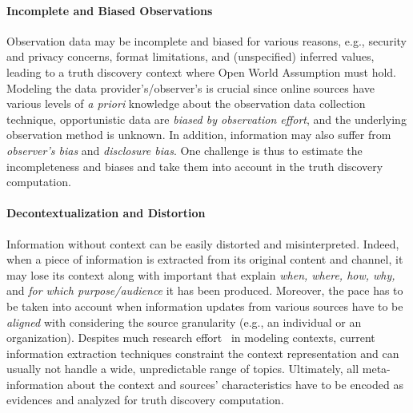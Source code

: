\documentclass[prodmode,acmtecs]{acmsmall} %
\begin{document}
\paragraph*{Incomplete and Biased Observations}  
Observation data may be incomplete and biased for various 
reasons, e.g., security and privacy concerns, format limitations, and 
(unspecified) inferred values, leading to a truth discovery context where Open World
Assumption must hold. Modeling the data provider's/observer's is crucial since online 
sources have  various levels of {\it a priori} knowledge about the observation data 
collection technique, opportunistic data are {\it biased by  observation effort}, and the underlying
observation method is unknown. In addition, information may also suffer from \emph{observer's bias} and
\emph{disclosure bias}. One challenge is thus to estimate the incompleteness and biases and take them into
account in the truth discovery computation.

\paragraph*{Decontextualization and Distortion}  
Information without context can be easily distorted and misinterpreted.
Indeed, when a piece of information is extracted from its original 
content and channel, it may lose its context along with important 
 that explain \emph{when, where, how, why,} and
\emph{for which purpose/audience} it has been produced.
Moreover, the pace has to be taken into account when information updates from 
various sources have to be \emph{aligned} with considering the source granularity 
(e.g., an individual or an organization). 
Despites much research effort~\cite{eps270829} in modeling contexts, current information
extraction techniques constraint the 
context representation and can usually not handle a wide, unpredictable range of topics. Ultimately,
all meta-information about the context and sources' 
characteristics have to be encoded as evidences and analyzed for truth discovery computation.

\iffalse
Besides challenges given above, \emph{cross-modal} and \emph{dynamic} truth discovery
are also in their infancy. Cross-modality is needed because of the multiple possible facets,
e.g., textual, pictures, and movies, of the same information that need to be reconcilied.
Dynamicity is due by the fact recieved information could be subjet to multiple transformations
through the transmission media or intermediate applications during its life cycle. We believe that directions
for tacking these appealing truth discovery problems could be 
\fi
\end{document}
